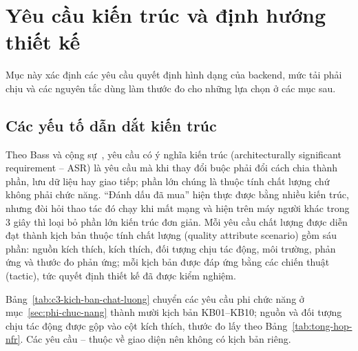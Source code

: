\section{Yêu cầu kiến trúc và định hướng thiết kế}\label{sec:yeu-cau-kien-truc}

Mục này xác định các yêu cầu quyết định hình dạng của backend, mức tải phải chịu và các nguyên tắc dùng làm thước đo cho những lựa chọn ở các mục sau.

\subsection{Các yếu tố dẫn dắt kiến trúc}\label{ssec:yeu-to-dan-dat}

Theo Bass và cộng sự~\cite{bass}, yêu cầu có ý nghĩa kiến trúc (architecturally significant requirement – ASR) là yêu cầu mà khi thay đổi buộc phải đổi cách chia thành phần, lưu dữ liệu hay giao tiếp; phần lớn chúng là thuộc tính chất lượng chứ không phải chức năng. “Đánh dấu đã mua” hiện thực được bằng nhiều kiến trúc, nhưng đòi hỏi thao tác đó chạy khi mất mạng và hiện trên máy người khác trong 3 giây thì loại bỏ phần lớn kiến trúc đơn giản. Mỗi yêu cầu chất lượng được diễn đạt thành kịch bản thuộc tính chất lượng (quality attribute scenario) gồm sáu phần: nguồn kích thích, kích thích, đối tượng chịu tác động, môi trường, phản ứng và thước đo phản ứng; mỗi kịch bản được đáp ứng bằng các chiến thuật (tactic), tức quyết định thiết kế đã được kiểm nghiệm.

Bảng~\ref{tab:c3-kich-ban-chat-luong} chuyển các yêu cầu phi chức năng ở mục~\ref{sec:phi-chuc-nang} thành mười kịch bản KB01–KB10; nguồn và đối tượng chịu tác động được gộp vào cột kích thích, thước đo lấy theo Bảng~\ref{tab:tong-hop-nfr}. Các yêu cầu -- thuộc về giao diện nên không có kịch bản riêng.

